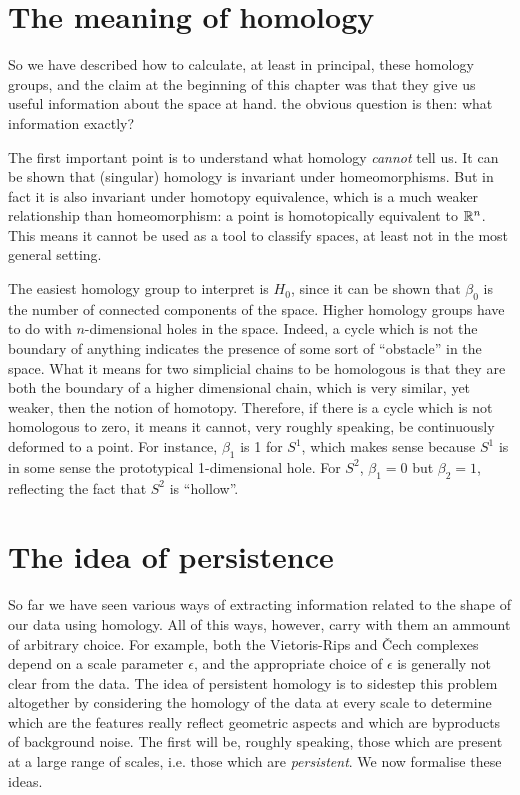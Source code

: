 \documentclass[../main.tex]{subfiles}
\begin{document}
\section{The meaning of homology}\label{sec:meaning}
So we have described how to calculate, at least in principal, these homology groups, and
the claim at the beginning of this chapter was that they give us useful information about
the space at hand. the obvious question is then: what information exactly?

The first important point is to understand what homology \emph{cannot} tell us. It can be
shown that (singular) homology is invariant under homeomorphisms. But in fact it is also
invariant under homotopy equivalence, which is a much weaker relationship than
homeomorphism: a point is homotopically equivalent to \( \mathbb{R}^n \). This means it cannot be
used as a tool to classify spaces, at least not in the most general setting. 

The easiest homology group to interpret is \( H_0 \), since it can be shown that \(
\beta_0 \) is the number of connected components of the space. Higher homology groups
have to do with \( n \)-dimensional holes in the space.  Indeed, a cycle which is not the
boundary of anything indicates the presence of some sort of ``obstacle'' in the space.
What it means for two simplicial chains to be homologous is that they are both the
boundary of a higher dimensional chain, which is very similar, yet weaker, then the notion
of homotopy. Therefore, if there is a cycle which is not homologous to zero, it means it
cannot, very roughly speaking, be continuously deformed to a point. For instance, \(
\beta_1 \) is 1 for \( S^1 \), which makes sense because \( S^1 \) is in some sense the
prototypical 1-dimensional hole. For \( S^2 \), \( \beta_1 = 0 \) but \( \beta_2 = 1 \),
reflecting the fact that \( S^2 \) is ``hollow''. 

\section{The idea of persistence}\label{sec:persistence} 
So far we have seen various ways of extracting information related to the shape of our
data using homology. All of this ways, however, carry with them an ammount of arbitrary
choice. For example, both the Vietoris-Rips and Čech complexes depend on a scale parameter
\( \epsilon \), and the appropriate choice of \( \epsilon \) is generally not clear from
the data. The idea of persistent homology is to sidestep this problem altogether by
considering the homology of the data at every scale to determine which are the features
really reflect geometric aspects and which are byproducts of background noise. The first
will be, roughly speaking, those which are present at a large range of scales, i.e. those
which are \emph{persistent}. We now formalise these ideas.
\end{document}
